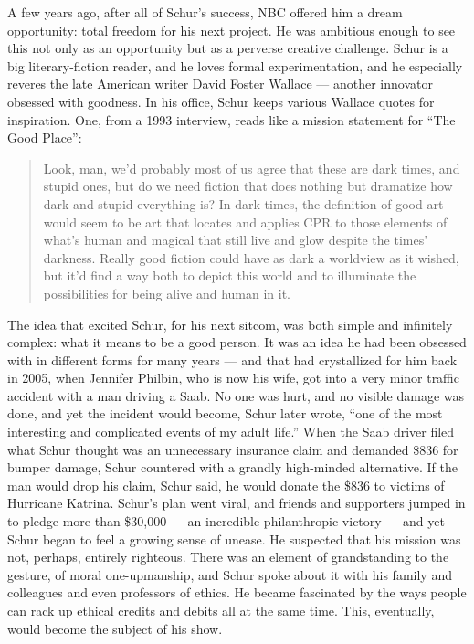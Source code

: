 A few years ago, after all of Schur's success, NBC offered him a dream
opportunity: total freedom for his next project. He was ambitious enough
to see this not only as an opportunity but as a perverse creative
challenge. Schur is a big literary-fiction reader, and he loves formal
experimentation, and he especially reveres the late American writer
David Foster Wallace --- another innovator obsessed with goodness. In
his office, Schur keeps various Wallace quotes for inspiration. One,
from a 1993 interview, reads like a mission statement for ``The Good
Place'':

\begin{quote}
Look, man, we'd probably most of us agree that these are dark times, and
stupid ones, but do we need fiction that does nothing but dramatize how
dark and stupid everything is? In dark times, the definition of good art
would seem to be art that locates and applies CPR to those elements of
what's human and magical that still live and glow despite the times'
darkness. Really good fiction could have as dark a worldview as it
wished, but it'd find a way both to depict this world and to illuminate
the possibilities for being alive and human in it.
\end{quote}

The idea that excited Schur, for his next sitcom, was both simple and
infinitely complex: what it means to be a good person. It was an idea he
had been obsessed with in different forms for many years --- and that
had crystallized for him back in 2005, when Jennifer Philbin, who is now
his wife, got into a very minor traffic accident with a man driving a
Saab. No one was hurt, and no visible damage was done, and yet the
incident would become, Schur later wrote, ``one of the most interesting
and complicated events of my adult life.'' When the Saab driver filed
what Schur thought was an unnecessary insurance claim and demanded \$836
for bumper damage, Schur countered with a grandly high-minded
alternative. If the man would drop his claim, Schur said, he would
donate the \$836 to victims of Hurricane Katrina. Schur's plan went
viral, and friends and supporters jumped in to pledge more than \$30,000
--- an incredible philanthropic victory --- and yet Schur began to feel
a growing sense of unease. He suspected that his mission was not,
perhaps, entirely righteous. There was an element of grandstanding to
the gesture, of moral one-upmanship, and Schur spoke about it with his
family and colleagues and even professors of ethics. He became
fascinated by the ways people can rack up ethical credits and debits all
at the same time. This, eventually, would become the subject of his
show.

